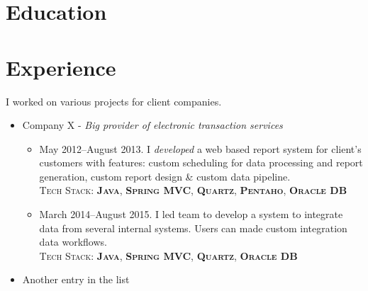 \documentclass[11pt,a4paper,sans]{moderncv} %
\begin{document}
\makecvtitle %


\section{Education}





\section{Experience}

{
I worked on various projects for client companies.
\begin{itemize}
  \item Company X - \textit{Big provider of electronic transaction services} 
    \begin{itemize}
      \item May 2012--August 2013. I \textit{developed} a web based report system for client's customers with features: custom scheduling for data processing and report generation, custom report design \& custom data pipeline.\\
      \textsc{Tech Stack: \textbf{Java}, \textbf{Spring MVC}, \textbf{Quartz}, \textbf{Pentaho}, \textbf{Oracle DB}}
      \item March 2014--August 2015. I led team to develop a system to integrate data from several internal systems. Users can made custom integration data workflows.\\ \textsc{Tech Stack: \textbf{Java}, \textbf{Spring MVC}, \textbf{Quartz}, \textbf{Oracle DB}}  
    \end{itemize}
  \item Another entry in the list
\end{itemize}
}
\end{document}
